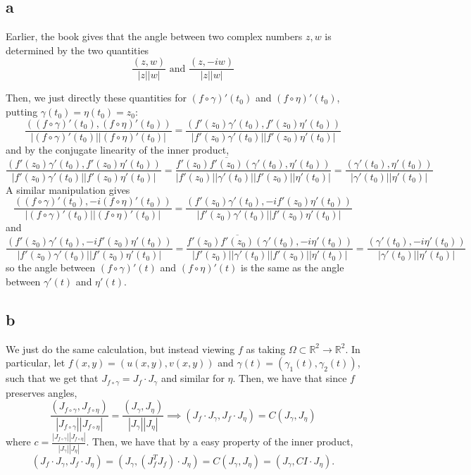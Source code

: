 \documentclass[12pt,letterpaper]{article}
\theoremstyle{definition}
\newcommand{\R}{\mathbb{R}}
\begin{document}
\subsection*{a}

Earlier, the book gives that the angle between two complex numbers $z, w$ is determined by the two quantities
\[
  \frac{(z,w)}{|z||w|} \text{       and       } \frac{(z, -iw)}{|z||w|}
\]

Then, we just directly these quantities for $(f \circ \gamma)'(t_{0})$ and $(f \circ \eta)'(t_{0})$, putting $\gamma(t_{0})  = \eta(t_{0}) = z_{0}$:
\[
  \frac{((f \circ \gamma)'(t_{0}), (f \circ \eta)'(t_{0}))}{|(f \circ \gamma)'(t_{0})| |(f \circ \eta)'(t_{0})|} =
  \frac{(f'(z_{0})\gamma'(t_{0}), f'(z_{0})\eta'(t_{0}))}{|f'(z_{0})\gamma'(t_{0})||f'(z_{0})\eta'(t_{0})|}
\]
and by the conjugate linearity of the inner product,
\[
  \frac{(f'(z_{0})\gamma'(t_{0}), f'(z_{0})\eta'(t_{0}))}{|f'(z_{0})\gamma'(t_{0})||f'(z_{0})\eta'(t_{0})|} =
  \frac{f'(z_{0})\overline{f'(z_{0})}(\gamma'(t_{0}), \eta'(t_{0}))}{|f'(z_{0})||\gamma'(t_{0})||f'(z_{0})||\eta'(t_{0})|} = \frac{(\gamma'(t_{0}), \eta'(t_{0}))}{|\gamma'(t_{0})||\eta'(t_{0})|}
\]
A similar manipulation gives
\[
  \frac{((f \circ \gamma)'(t_{0}), -i(f \circ \eta)'(t_{0}))}{|(f \circ \gamma)'(t_{0})| |(f \circ \eta)'(t_{0})|} =
  \frac{(f'(z_{0})\gamma'(t_{0}), -if'(z_{0})\eta'(t_{0}))}{|f'(z_{0})\gamma'(t_{0})||f'(z_{0})\eta'(t_{0})|}
\]
and
\[
  \frac{(f'(z_{0})\gamma'(t_{0}), -if'(z_{0})\eta'(t_{0}))}{|f'(z_{0})\gamma'(t_{0})||f'(z_{0})\eta'(t_{0})|} =
  \frac{f'(z_{0})\overline{f'(z_{0})}(\gamma'(t_{0}), -i\eta'(t_{0}))}{|f'(z_{0})||\gamma'(t_{0})||f'(z_{0})||\eta'(t_{0})|} = \frac{(\gamma'(t_{0}), -i\eta'(t_{0}))}{|\gamma'(t_{0})||\eta'(t_{0})|}
\]
so the angle between $(f \circ \gamma)'(t)$ and $(f \circ \eta)'(t)$ is the same as the angle between $\gamma'(t)$ and $\eta'(t)$.

\subsection*{b}

We just do the same calculation, but instead viewing $f$ as taking $\Omega \subset \R^{2} \rightarrow \R^{2}$. In particular, let $f(x,y) = (u(x,y), v(x,y))$ and $\gamma(t) = (\gamma_{1}(t), \gamma_{2}(t))$, such that we get that $J_{f \circ \gamma} = J_{f} \cdot J_{\gamma}$ and similar for $\eta$. Then, we have that since $f$ preserves angles,
\[
  \frac{(J_{f \circ \gamma}, J_{f \circ \eta})}{|J_{f \circ \gamma}||J_{f \circ \eta}|} = \frac{(J_{\gamma}, J_{\eta})}{|J_{\gamma}||J_{\eta}|} \implies (J_{f} \cdot J_{\gamma}, J_{f} \cdot J_{\eta}) = C(J_{\gamma}, J_{\eta})
\]
where $c = \frac{|J_{f \circ \gamma}||J_{f \circ \eta}|}{|J_{\gamma}||J_{\eta}|}$. Then, we have that by a easy property of the inner product,
\[
  (J_{f} \cdot J_{\gamma}, J_{f} \cdot J_{\eta}) = (J_{\gamma}, (J_{f}^{T}J_{f}) \cdot J_{\eta}) = C(J_{\gamma}, J_{\eta}) = (J_{\gamma}, CI \cdot J_{\eta}).
\]
\end{document}
